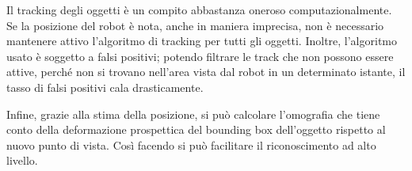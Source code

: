 Il tracking degli oggetti è un compito abbastanza oneroso computazionalmente. Se la posizione del robot è nota, anche in maniera imprecisa, non è necessario mantenere attivo l'algoritmo di tracking per tutti gli oggetti. Inoltre, l'algoritmo usato è soggetto a falsi positivi; potendo filtrare le track che non possono essere attive, perché non si trovano nell'area vista dal robot in un determinato istante, il tasso di falsi positivi cala drasticamente.

Infine, grazie alla stima della posizione, si può calcolare l'omografia che tiene conto della deformazione prospettica del bounding box dell'oggetto rispetto al nuovo punto di vista. Così facendo si può facilitare il riconoscimento ad alto livello.
